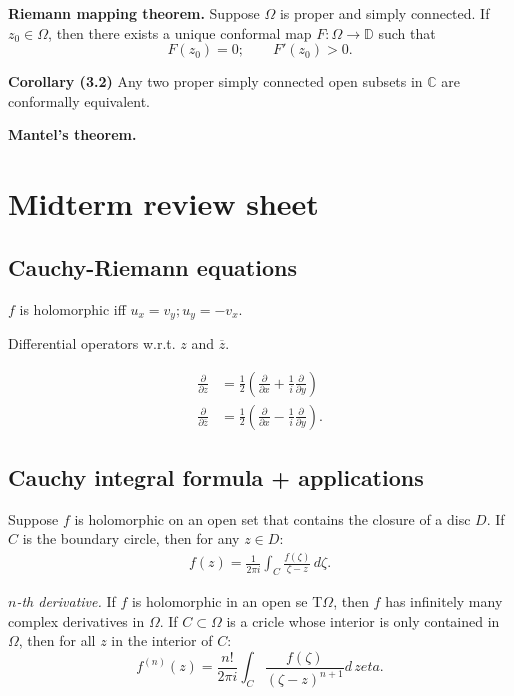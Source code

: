 \documentclass[12pt]{article}
\newcommand{\CC}{\mathbb{C}}
\newcommand{\DD}{\mathbb{D}}
\newcommand{\ol}{\overline}
\def\CC{\mathbb{C}}
\begin{document}
        {\bf Riemann mapping theorem.} Suppose $\Omega$ is proper and simply connected.  If $z_0 \in \Omega$, then there exists a unique conformal map $F: \Omega \to \DD$ such that 
        \[
          F(z_0) = 0; \qquad F'(z_0) > 0.
        \]

        {\bf Corollary (3.2)} Any two proper simply connected open subsets in $\CC$ are conformally equivalent.

        {\bf Mantel's theorem.}


        \newpage
        \section{Midterm review sheet}

        \subsection{Cauchy-Riemann equations}

        $f$ is holomorphic iff $u_x = v_y; u_y = - v_x$.

        Differential operators w.r.t. $z$ and $\ol{z}$.

        \begin{align*}
          \frac{\partial}{\partial z} &= \frac{1}{2} \left( \frac{\partial}{\partial x} + \frac{1}{i} \frac{\partial }{\partial y} \right) \\
          \frac{\partial}{\partial \ol{z}} &= \frac{1}{2} \left( \frac{\partial}{\partial x} - \frac{1}{i} \frac{\partial }{\partial y} \right).
        \end{align*}

        \subsection{Cauchy integral formula + applications}

        Suppose $f$ is holomorphic on an open set that contains the closure of a disc $D$.  If $C$ is the boundary circle, then for any $z \in D$:
        \begin{align*}
          f(z) = \frac{1}{2 \pi i} \int_{C} \frac{f(\zeta)}{\zeta - z} \, d \zeta.
        \end{align*}

        {\it $n$-th derivative.} If $f$ is holomorphic in an open se T$\Omega$, then $f$ has infinitely many complex derivatives in $\Omega$.  If $C \subset \Omega$ is a cricle whose interior is only contained in $\Omega$, then for all $z$ in the interior of $C$:
        \[
          f^{(n)}(z) = \frac{n!}{2\pi i} \int_{C} \frac{f(\zeta)}{(\zeta - z)^{n+1}} d \, zeta.
        \]
\end{document}

